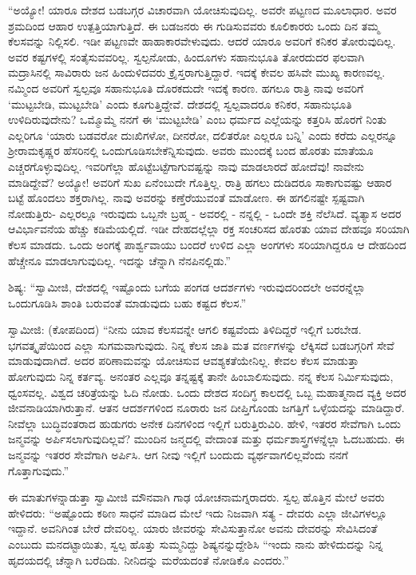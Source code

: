  “ಅಯ್ಯೋ! ಯಾರೂ ದೇಶದ ಬಡಬಗ್ಗರ ವಿಚಾರವಾಗಿ ಯೋಚಿಸುವುದಿಲ್ಲ. ಅವರೇ ಪಟ್ಟಣದ ಮೂಲಾಧಾರ. ಅವರ ಶ್ರಮದಿಂದ ಆಹಾರ ಉತ್ಪತ್ತಿಯಾಗುತ್ತಿದೆ. ಈ ಬಡಜನರು ಈ ಗುಡಿಸುವವರು ಕೂಲಿಕಾರರು ಒಂದು ದಿನ ತಮ್ಮ ಕೆಲಸವನ್ನು ನಿಲ್ಲಿಸಲಿ. ಇಡೀ ಪಟ್ಟಣವೇ ಹಾಹಾಕಾರವೇಳುವುದು. ಆದರೆ ಯಾರೂ ಅವರಿಗೆ ಕನಿಕರ ತೋರುವುದಿಲ್ಲ. ಅವರ ಕಷ್ಟಗಳಲ್ಲಿ ಸಂತೈಸುವವರಿಲ್ಲ. ಸ್ವಲ್ಪನೋಡು, ಹಿಂದೂಗಳು ಸಹಾನುಭೂತಿ ತೋರದುದರ ಫಲವಾಗಿ ಮದ್ರಾಸಿನಲ್ಲಿ ಸಾವಿರಾರು ಜನ ಹಿಂದುಳಿದವರು ಕ್ರೈಸ್ತರಾಗುತ್ತಿದ್ದಾರೆ. ಇದಕ್ಕೆ ಕೇವಲ ಹಸಿವೇ ಮುಖ್ಯ ಕಾರಣವಲ್ಲ. ನಮ್ಮಿಂದ ಅವರಿಗೆ ಸ್ವಲ್ಪವೂ ಸಹಾನುಭೂತಿ ದೊರಕದುದೇ ಇದಕ್ಕೆ ಕಾರಣ. ಹಗಲೂ ರಾತ್ರಿ ನಾವು ಅವರಿಗೆ ‘ಮುಟ್ಟಬೇಡಿ, ಮುಟ್ಟಬೇಡಿ’ ಎಂದು ಕೂಗುತ್ತಿದ್ದೇವೆ. ದೇಶದಲ್ಲಿ ಸ್ವಲ್ಪವಾದರೂ ಕನಿಕರ, ಸಹಾನುಭೂತಿ ಉಳಿದಿರುವುದೇನು? ಒಮ್ಮೊಮ್ಮೆ ನನಗೆ ಈ ‘ಮುಟ್ಟಬೇಡಿ’ ಎಂಬ ಧರ್ಮದ ಎಲ್ಲೆಯನ್ನು ಕತ್ತರಿಸಿ ಹೊರಗೆ ನಿಂತು ಎಲ್ಲರಿಗೂ ‘ಯಾರು ಬಡವರೋ ದುಃಖಿಗಳೋ, ದೀನರೋ, ದಲಿತರೋ ಎಲ್ಲರೂ ಬನ್ನಿ’ ಎಂದು ಕರೆದು ಎಲ್ಲರನ್ನೂ ಶ‍್ರೀರಾಮಕೃಷ್ಣರ ಹೆಸರಿನಲ್ಲಿ ಒಂದುಗೂಡಿಸಬೇಕೆನ್ನಿಸುವುದು. ಅವರು ಮುಂದಕ್ಕೆ ಬಂದ ಹೊರತು ಮಾತೆಯೂ ಎಚ್ಚರಗೊಳ್ಳುವುದಿಲ್ಲ. ಇವರಿಗೆಲ್ಲಾ ಹೊಟ್ಟೆಬಟ್ಟೆಗಾಗುವಷ್ಟನ್ನು ನಾವು ಮಾಡಲಾರದೆ ಹೋದೆವು‌! ನಾವೇನು ಮಾಡಿದ್ದೇವೆ? ಅಯ್ಯೋ! ಅವರಿಗೆ ಸುಖ ಏನೆಂಬುದೇ ಗೊತ್ತಿಲ್ಲ. ರಾತ್ರಿ ಹಗಲು ದುಡಿದರೂ ಸಾಕಾಗುವಷ್ಟು ಆಹಾರ ಬಟ್ಟೆ ಹೊಂದಲು ಶಕ್ತರಾಗಿಲ್ಲ. ನಾವು ಅವರನ್ನು ಕಣ್ತೆರೆಯುವಂತೆ ಮಾಡೋಣ. ಈ ಹಗಲಿನಷ್ಟೇ ಸ್ಪಷ್ಟವಾಗಿ ನೋಡುತ್ತಿರು- ಎಲ್ಲರಲ್ಲೂ ಇರುವುದು ಒಬ್ಬನೇ ಬ್ರಹ್ಮ - ಅವರಲ್ಲಿ - ನನ್ನಲ್ಲಿ - ಒಂದೇ ಶಕ್ತಿ ನೆಲೆಸಿದೆ. ವ್ಯತ್ಯಾಸ ಅದರ ಆವಿರ್ಭಾವನೆಯ ಹೆಚ್ಚು ಕಡಿಮೆಯಲ್ಲಿದೆ. ಇಡೀ ದೇಹದಲ್ಲೆಲ್ಲಾ ರಕ್ತ ಸಂಚರಿಸದ ಹೊರತು ಯಾವ ದೇಹವೂ ಸರಿಯಾಗಿ ಕೆಲಸ ಮಾಡದು. ಒಂದು ಅಂಗಕ್ಕೆ ಪಾರ್ಶ್ವವಾಯು ಬಂದರೆ ಉಳಿದ ಎಲ್ಲಾ ಅಂಗಗಳು ಸರಿಯಾಗಿದ್ದರೂ ಆ ದೇಹದಿಂದ ಹೆಚ್ಚೇನೂ ಮಾಡಲಾಗುವುದಿಲ್ಲ. ಇದನ್ನು ಚೆನ್ನಾಗಿ ನೆನಪಿನಲ್ಲಿಡು.” 

 ಶಿಷ್ಯ: “ಸ್ವಾಮೀಜಿ, ದೇಶದಲ್ಲಿ ಇಷ್ಟೊಂದು ಬಗೆಯ ಪಂಗಡ ಆದರ್ಶಗಳು ಇರುವುದರಿಂದಲೇ ಅವರನ್ನೆಲ್ಲಾ ಒಂದುಗೂಡಿಸಿ ಶಾಂತಿ ಬರುವಂತೆ ಮಾಡುವುದು ಬಹು ಕಷ್ಟದ ಕೆಲಸ.” 

 ಸ್ವಾಮೀಜಿ: (ಕೋಪದಿಂದ) “ನೀನು ಯಾವ ಕೆಲಸವನ್ನೇ ಆಗಲಿ ಕಷ್ಟವೆಂದು ತಿಳಿದಿದ್ದರೆ ಇಲ್ಲಿಗೆ ಬರಬೇಡ. ಭಗವತ್ಕೃಪೆಯಿಂದ ಎಲ್ಲಾ ಸುಗಮವಾಗುವುದು. ನಿನ್ನ ಕೆಲಸ ಜಾತಿ ಮತ ವರ್ಣಗಳನ್ನು ಲೆಕ್ಕಿಸದೆ ಬಡಬಗ್ಗರಿಗೆ ಸೇವೆ ಮಾಡುವುದಾಗಿದೆ. ಅದರ ಪರಿಣಾಮವನ್ನು ಯೋಚಿಸುವ ಆವಶ್ಯಕತೆಯೇನಿಲ್ಲ. ಕೇವಲ ಕೆಲಸ ಮಾಡುತ್ತಾ ಹೋಗುವುದು ನಿನ್ನ ಕರ್ತವ್ಯ. ಅನಂತರ ಎಲ್ಲವೂ ತನ್ನಷ್ಟಕ್ಕೆ ತಾನೇ ಹಿಂಬಾಲಿಸುವುದು. ನನ್ನ ಕೆಲಸ ನಿರ್ಮಿಸುವುದು, ಧ್ವಂಸವಲ್ಲ. ವಿಶ್ವದ ಚರಿತ್ರೆಯನ್ನು ಓದಿ ನೋಡು. ಒಂದು ದೇಶದ ಸಂದಿಗ್ಧ ಕಾಲದಲ್ಲಿ ಒಬ್ಬ ಮಹಾತ್ಮನಾದ ವ್ಯಕ್ತಿ ಅದರ ಜೀವನಾಡಿಯಾಗಿರುತ್ತಾನೆ. ಆತನ ಆದರ್ಶಗಳಿಂದ ನೂರಾರು ಜನ ದೀಪ್ತಿಗೊಂಡು ಜಗತ್ತಿಗೆ ಒಳ್ಳೆಯದನ್ನು ಮಾಡಿದ್ದಾರೆ. ನೀವೆಲ್ಲಾ ಬುದ್ಧಿವಂತರಾದ ಹುಡುಗರು ಅನೇಕ ದಿನಗಳಿಂದ ಇಲ್ಲಿಗೆ ಬರುತ್ತಿರುವಿರಿ. ಹೇಳಿ, ಇತರರ ಸೇವೆಗಾಗಿ ಒಂದು ಜನ್ಮವನ್ನು ಅರ್ಪಿಸಲಾಗುವುದಿಲ್ಲವೆ? ಮುಂದಿನ ಜನ್ಮದಲ್ಲಿ ವೇದಾಂತ ಮತ್ತು ಧರ್ಮಶಾಸ್ತ್ರಗಳನ್ನೆಲ್ಲಾ ಓದಬಹುದು. ಈ ಜನ್ಮವನ್ನು ಇತರರ ಸೇವೆಗಾಗಿ ಅರ್ಪಿಸಿ. ಆಗ ನೀವು ಇಲ್ಲಿಗೆ ಬಂದುದು ವ್ಯರ್ಥವಾಗಲಿಲ್ಲವೆಂದು ನನಗೆ ಗೊತ್ತಾಗುವುದು.” 

 ಈ ಮಾತುಗಳನ್ನಾಡುತ್ತಾ ಸ್ವಾಮೀಜಿ ಮೌನವಾಗಿ ಗಾಢ ಯೋಚನಾಮಗ್ನರಾದರು. ಸ್ವಲ್ಪ ಹೊತ್ತಿನ ಮೇಲೆ ಅವರು ಹೇಳಿದರು: “ಅಷ್ಟೊಂದು ಕಠಿಣ ಸಾಧನೆ ಮಾಡಿದ ಮೇಲೆ ಇದು ನಿಜವಾಗಿ ಸತ್ಯ - ದೇವರು ಎಲ್ಲಾ ಜೀವಿಗಳಲ್ಲೂ ಇದ್ದಾನೆ. ಅವನಿಗಿಂತ ಬೇರೆ ದೇವರಿಲ್ಲ. ಯಾರು ಜೀವರನ್ನು ಸೇವಿಸುತ್ತಾನೋ ಅವನು ದೇವರನ್ನು ಸೇವಿಸಿದಂತೆ ಎಂಬುದು ಮನದಟ್ಟಾಯಿತು, ಸ್ವಲ್ಪ ಹೊತ್ತು ಸುಮ್ಮನಿದ್ದು ಶಿಷ್ಯನನ್ನುದ್ದೇಶಿಸಿ “ಇಂದು ನಾನು ಹೇಳಿದುದನ್ನು ನಿನ್ನ ಹೃದಯದಲ್ಲಿ ಚೆನ್ನಾಗಿ ಬರೆದಿಡು. ನೀನಿದನ್ನು ಮರೆಯದಂತೆ ನೋಡಿಕೊ ಎಂದರು.” 

